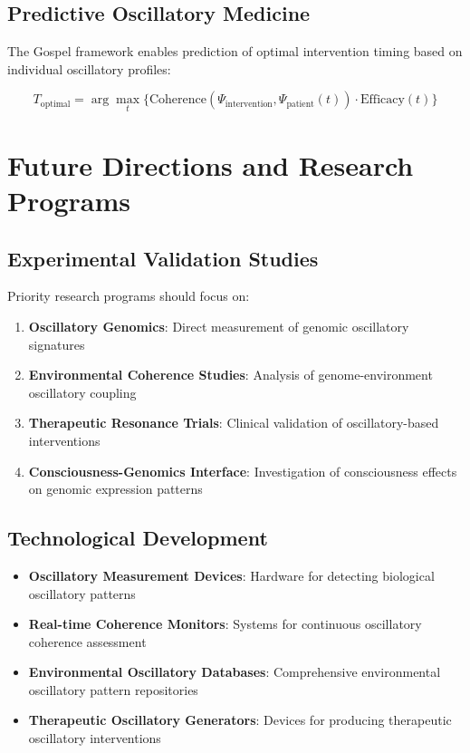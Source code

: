 \documentclass[12pt,a4paper]{article}
\begin{document}
\subsection{Predictive Oscillatory Medicine}

The Gospel framework enables prediction of optimal intervention timing based on individual oscillatory profiles:

$$T_{\text{optimal}} = \arg\max_{t} \{\text{Coherence}(\Psi_{\text{intervention}}, \Psi_{\text{patient}}(t)) \cdot \text{Efficacy}(t)\}$$

\section{Future Directions and Research Programs}

\subsection{Experimental Validation Studies}

Priority research programs should focus on:

\begin{enumerate}
\item \textbf{Oscillatory Genomics}: Direct measurement of genomic oscillatory signatures
\item \textbf{Environmental Coherence Studies}: Analysis of genome-environment oscillatory coupling
\item \textbf{Therapeutic Resonance Trials}: Clinical validation of oscillatory-based interventions
\item \textbf{Consciousness-Genomics Interface}: Investigation of consciousness effects on genomic expression patterns
\end{enumerate}

\subsection{Technological Development}

\begin{itemize}
\item \textbf{Oscillatory Measurement Devices}: Hardware for detecting biological oscillatory patterns
\item \textbf{Real-time Coherence Monitors}: Systems for continuous oscillatory coherence assessment  
\item \textbf{Environmental Oscillatory Databases}: Comprehensive environmental oscillatory pattern repositories
\item \textbf{Therapeutic Oscillatory Generators}: Devices for producing therapeutic oscillatory interventions
\end{itemize}
\end{document}
